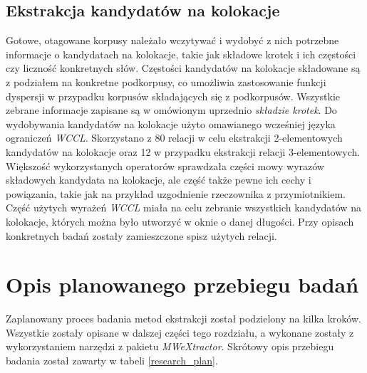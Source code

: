 \subsection{Ekstrakcja kandydatów na kolokacje}
Gotowe, otagowane korpusy należało wczytywać i wydobyć z nich potrzebne informacje o kandydatach na kolokacje, takie jak składowe krotek i ich częstości czy liczność konkretnych słów.
Częstości kandydatów na kolokacje składowane są z podziałem na konkretne podkorpusy, co umożliwia zastosowanie funkcji dyspersji w przypadku korpusów składających się z podkorpusów.
Wszystkie zebrane informacje zapisane są w omówionym uprzednio \emph{składzie krotek}.
Do wydobywania kandydatów na kolokacje użyto omawianego wcześniej języka ograniczeń \emph{WCCL}.
Skorzystano z 80 relacji w celu ekstrakcji 2-elementowych kandydatów na kolokacje oraz 12 w przypadku ekstrakcji relacji 3-elementowych.
Większość wykorzystanych operatorów sprawdzała części mowy wyrazów składowych kandydata na kolokacje, ale część także pewne ich cechy i powiązania, takie jak na przykład uzgodnienie rzeczownika z przymiotnikiem.
Część użytych wyrażeń \emph{WCCL} miała na celu zebranie wszystkich kandydatów na kolokacje, których można było utworzyć w oknie o danej długości.
Przy opisach konkretnych badań zostały zamieszczone spisz użytych relacji.

\section{Opis planowanego przebiegu badań}
Zaplanowany proces badania metod ekstrakcji został podzielony na kilka kroków.
Wszystkie zostały opisane w dalszej części tego rozdziału, a wykonane zostały z wykorzystaniem narzędzi z pakietu \emph{MWeXtractor}.
Skrótowy opis przebiegu badania został zawarty w tabeli \ref{research_plan}.

